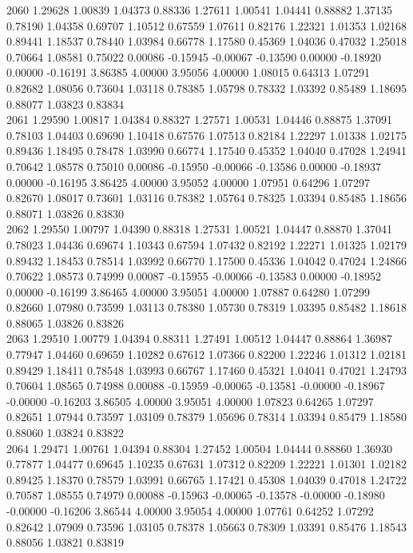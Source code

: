 {2060 1.29628 1.00839 1.04373 0.88336 1.27611 1.00541 1.04441 0.88882 1.37135 0.78190 1.04358 0.69707 1.10512 0.67559 1.07611 0.82176 1.22321 1.01353 1.02168 0.89441 1.18537 0.78440 1.03984 0.66778 1.17580 0.45369 1.04036 0.47032 1.25018 0.70664 1.08581 0.75022 0.00086 -0.15945 -0.00067 -0.13590 0.00000 -0.18920 0.00000 -0.16191 3.86385 4.00000 3.95056 4.00000 1.08015 0.64313 1.07291 0.82682 1.08056 0.73604 1.03118 0.78385 1.05798 0.78332 1.03392 0.85489 1.18695 0.88077 1.03823 0.83834 \\
2061 1.29590 1.00817 1.04384 0.88327 1.27571 1.00531 1.04446 0.88875 1.37091 0.78103 1.04403 0.69690 1.10418 0.67576 1.07513 0.82184 1.22297 1.01338 1.02175 0.89436 1.18495 0.78478 1.03990 0.66774 1.17540 0.45352 1.04040 0.47028 1.24941 0.70642 1.08578 0.75010 0.00086 -0.15950 -0.00066 -0.13586 0.00000 -0.18937 0.00000 -0.16195 3.86425 4.00000 3.95052 4.00000 1.07951 0.64296 1.07297 0.82670 1.08017 0.73601 1.03116 0.78382 1.05764 0.78325 1.03394 0.85485 1.18656 0.88071 1.03826 0.83830 \\
2062 1.29550 1.00797 1.04390 0.88318 1.27531 1.00521 1.04447 0.88870 1.37041 0.78023 1.04436 0.69674 1.10343 0.67594 1.07432 0.82192 1.22271 1.01325 1.02179 0.89432 1.18453 0.78514 1.03992 0.66770 1.17500 0.45336 1.04042 0.47024 1.24866 0.70622 1.08573 0.74999 0.00087 -0.15955 -0.00066 -0.13583 0.00000 -0.18952 0.00000 -0.16199 3.86465 4.00000 3.95051 4.00000 1.07887 0.64280 1.07299 0.82660 1.07980 0.73599 1.03113 0.78380 1.05730 0.78319 1.03395 0.85482 1.18618 0.88065 1.03826 0.83826 \\
2063 1.29510 1.00779 1.04394 0.88311 1.27491 1.00512 1.04447 0.88864 1.36987 0.77947 1.04460 0.69659 1.10282 0.67612 1.07366 0.82200 1.22246 1.01312 1.02181 0.89429 1.18411 0.78548 1.03993 0.66767 1.17460 0.45321 1.04041 0.47021 1.24793 0.70604 1.08565 0.74988 0.00088 -0.15959 -0.00065 -0.13581 -0.00000 -0.18967 -0.00000 -0.16203 3.86505 4.00000 3.95051 4.00000 1.07823 0.64265 1.07297 0.82651 1.07944 0.73597 1.03109 0.78379 1.05696 0.78314 1.03394 0.85479 1.18580 0.88060 1.03824 0.83822 \\
2064 1.29471 1.00761 1.04394 0.88304 1.27452 1.00504 1.04444 0.88860 1.36930 0.77877 1.04477 0.69645 1.10235 0.67631 1.07312 0.82209 1.22221 1.01301 1.02182 0.89425 1.18370 0.78579 1.03991 0.66765 1.17421 0.45308 1.04039 0.47018 1.24722 0.70587 1.08555 0.74979 0.00088 -0.15963 -0.00065 -0.13578 -0.00000 -0.18980 -0.00000 -0.16206 3.86544 4.00000 3.95054 4.00000 1.07761 0.64252 1.07292 0.82642 1.07909 0.73596 1.03105 0.78378 1.05663 0.78309 1.03391 0.85476 1.18543 0.88056 1.03821 0.83819 \\
}
